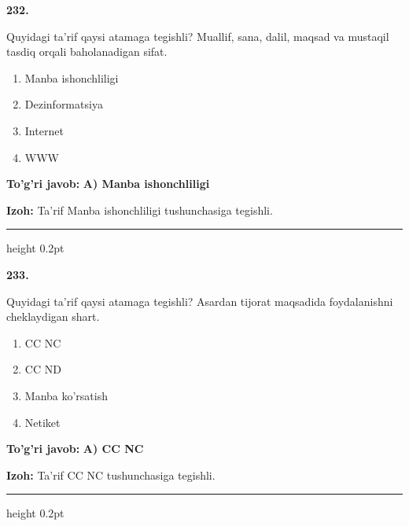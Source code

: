 \documentclass[10pt,a4paper,oneside]{article}
\begin{document}
\noindent\textbf{\color{ink}232.}
\par
Quyidagi ta'rif qaysi atamaga tegishli? Muallif, sana, dalil, maqsad va mustaqil tasdiq orqali baholanadigan sifat.
\begin{enumerate}[label=\Alph*),leftmargin=9mm]
\item Manba ishonchliligi
\item Dezinformatsiya
\item Internet
\item WWW
\end{enumerate}
\begin{tcolorbox}[enhanced,breakable,colback=teal!4,colframe=teal!50!black,boxrule=0.5pt,arc=1.1mm,left=3mm,right=3mm,top=1.7mm,bottom=1.7mm,before skip=2mm,after skip=2mm]
\textbf{\color{teal}To'g'ri javob:} \textbf{A) Manba ishonchliligi}
\par\smallskip
\textbf{Izoh:} Ta'rif Manba ishonchliligi tushunchasiga tegishli.
\end{tcolorbox}
\vspace{2mm}\hrule height 0.2pt \vspace{3mm}

\noindent\textbf{\color{ink}233.}
\par
Quyidagi ta'rif qaysi atamaga tegishli? Asardan tijorat maqsadida foydalanishni cheklaydigan shart.
\begin{enumerate}[label=\Alph*),leftmargin=9mm]
\item CC NC
\item CC ND
\item Manba ko'rsatish
\item Netiket
\end{enumerate}
\begin{tcolorbox}[enhanced,breakable,colback=teal!4,colframe=teal!50!black,boxrule=0.5pt,arc=1.1mm,left=3mm,right=3mm,top=1.7mm,bottom=1.7mm,before skip=2mm,after skip=2mm]
\textbf{\color{teal}To'g'ri javob:} \textbf{A) CC NC}
\par\smallskip
\textbf{Izoh:} Ta'rif CC NC tushunchasiga tegishli.
\end{tcolorbox}
\vspace{2mm}\hrule height 0.2pt \vspace{3mm}
\end{document}
